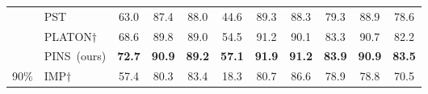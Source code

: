 \begin{table}[t]
\begin{tabular}{c|l|cccccccc|c}
		&PST                                             &          63.0                                                                              &       87.4   & 88.0                                                                              &      44.6                                                                                   &  89.3                                                                                        &    88.3                                                                                     &    79.3                                                                                     &  88.9                                                                    &  78.6                \\
		&PLATON$\dagger$                                             &   68.6                                                                                     & 89.8                                                                                    &89.0   &     54.5                                                                                    & 91.2                                                                                         &   90.1                                                                                      &    83.3                                                                                     &    90.7                                                                 &82.2                   \\
		&PINS~(ours)                                             &\textbf{72.7}                                                                                       &\textbf{90.9}                                                                                      &\textbf{89.2}   & \textbf{57.1}                                                                                      & \textbf{91.9}                                                                                       &\textbf{91.2}                                                                                         &  \textbf{83.9}                                                                                      &  \textbf{90.9}                                                                    & \textbf{83.5}               \\
		\midrule
		\multirow{6}{*}{90\%}     &IMP$\dagger$                                                 &57.4                                                                                       &80.3                                                                           &83.4             & 18.3                                                                                        &  80.7                                                                                        & 86.6                                                                                        &78.9                                                                                         &78.8                                                                     &  70.5                 \\

\end{tabular}
\end{table}
